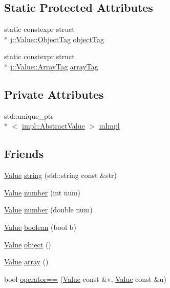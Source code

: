 \subsection*{Static Protected Attributes}
\begin{DoxyCompactItemize}
\item 
static constexpr struct \\*
\hyperlink{structj_1_1_value_1_1_object_tag}{j\-::\-Value\-::\-Object\-Tag} \hyperlink{classj_1_1_value_adb703d34b8b58a1a301183d092b86a16}{object\-Tag}
\item 
static constexpr struct \\*
\hyperlink{structj_1_1_value_1_1_array_tag}{j\-::\-Value\-::\-Array\-Tag} \hyperlink{classj_1_1_value_a222ab93e1ee2faeb71d53d98cf3fda2a}{array\-Tag}
\end{DoxyCompactItemize}
\subsection*{Private Attributes}
\begin{DoxyCompactItemize}
\item 
std\-::unique\-\_\-ptr\\*
$<$ \hyperlink{classj_1_1impl_1_1_abstract_value}{impl\-::\-Abstract\-Value} $>$ \hyperlink{classj_1_1_value_a07b659b8454529ba651033e32a203540}{m\-Impl}
\end{DoxyCompactItemize}
\subsection*{Friends}
\begin{DoxyCompactItemize}
\item 
\hyperlink{classj_1_1_value}{Value} \hyperlink{classj_1_1_value_a708a58b570f1bc42bb0fcf3468ea9ab8}{string} (std\-::string const \&str)
\item 
\hyperlink{classj_1_1_value}{Value} \hyperlink{classj_1_1_value_ac0ea80516ee9924893236d06b3e6bce1}{number} (int num)
\item 
\hyperlink{classj_1_1_value}{Value} \hyperlink{classj_1_1_value_a8db9f9d7dced9b3f7e0d02428b9d03df}{number} (double num)
\item 
\hyperlink{classj_1_1_value}{Value} \hyperlink{classj_1_1_value_ac55f3b10c1cdf64e972218bfe8a4a765}{boolean} (bool b)
\item 
\hyperlink{classj_1_1_value}{Value} \hyperlink{classj_1_1_value_aa3610e219f0408f5fd719424e97e49b8}{object} ()
\item 
\hyperlink{classj_1_1_value}{Value} \hyperlink{classj_1_1_value_a096dcae90f5613badf5c03a64364cb8a}{array} ()
\item 
bool \hyperlink{classj_1_1_value_afee27e684d505a356ce824b1c27d3e79}{operator==} (\hyperlink{classj_1_1_value}{Value} const \&v, \hyperlink{classj_1_1_value}{Value} const \&u)
\end{DoxyCompactItemize}


